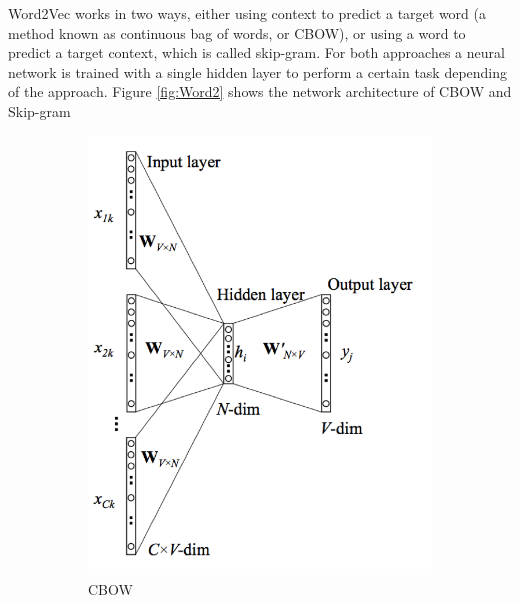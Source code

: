 \documentclass[]{article}
\begin{document}
	Word2Vec works in two ways, either using context to predict a target word (a method known as continuous bag of words, or CBOW), or using a word to predict a target context, which is called skip-gram. For both approaches a neural network is trained with a single hidden layer to perform a certain task depending of the approach. Figure \ref{fig:Word2} shows the network architecture of CBOW and Skip-gram
	
	\begin{figure}
		\begin{subfigure}{.5\textwidth}
			\centering
			\includegraphics[width=.8\linewidth]{Figures/CBOW}
			\caption{CBOW}
			\label{fig:sfig1}
		\end{subfigure}%
		\begin{subfigure}{.5\textwidth}
			\centering

\end{subfigure}
\end{figure}
\end{document}
